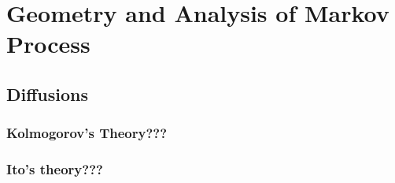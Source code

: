 \chapter{Geometry and Analysis of Markov Process}

\section{Diffusions}



\subsection{Kolmogorov's Theory???}


\subsection{Ito's theory???}